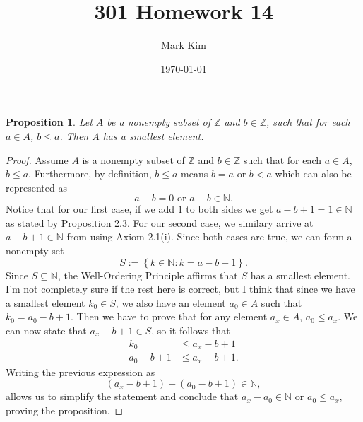 \documentclass[12pt]{amsart}
\title{301 Homework 14}
\author{Mark Kim}
\date{\today}
\newcommand{\Z}{\mathbb{Z}}
\newcommand{\N}{\mathbb{N}}
\newtheorem*{proposition}{Proposition}
\begin{document}
\maketitle

\begin{proposition}
Let $A$ be a nonempty subset of $\Z$ and $b\in\Z$, such that for each $a\in A$, $b\leq a$. Then $A$ has a smallest element.
\end{proposition}

\begin{proof}
Assume $A$ is a nonempty subset of $\Z$ and $b\in\Z$ such that for each $a\in A$, $b\leq a$.  Furthermore, by definition, $b\leq a$ means $b=a$ or $b<a$ which can also be represented as
\[a-b=0\text{ or }a-b\in\N.\]
Notice that for our first case, if we add $1$ to both sides we get $a-b+1=1\in\N$ as stated by Proposition 2.3.  For our second case, we similary arrive at $a-b+1\in\N$ from using Axiom 2.1(i). Since both cases are true, we can form a nonempty set
\[ S:=\left\{ k\in\N:k = a-b+1\right\}.\]
Since $S\subseteq\N$, the Well-Ordering Principle affirms that $S$ has a smallest element.  I'm not completely sure if the rest here is correct, but I think that since we have a smallest element $k_0\in S$, we also have an element $a_0\in A$ such that $k_0 = a_0-b+1$.  Then we have to prove that for any element $a_x\in A$, $a_0\leq a_x$.  We can now state that $a_x-b+1\in S$, so it follows that
\begin{align*}
k_0&\leq a_x-b+1\\
a_0-b+1&\leq a_x-b+1.
\end{align*}
Writing the previous expression as \[(a_x-b+1)-(a_0-b+1)\in\N,\]allows us to simplify the statement and conclude that $a_x-a_0\in\N$ or $a_0\leq a_x$, proving the proposition.
\end{proof}
\end{document}

